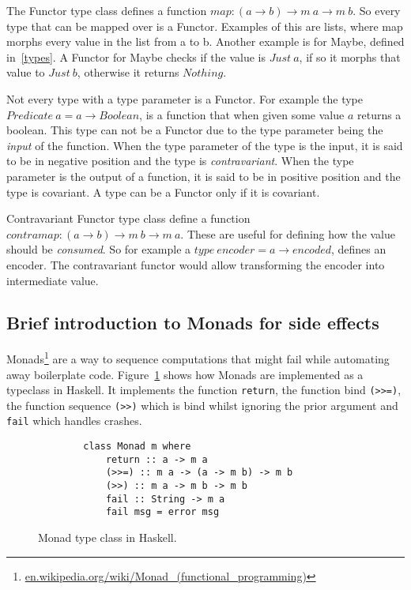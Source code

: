 The Functor type class defines a function $map : (a\rightarrow b) \rightarrow m\
a \rightarrow m\ b$. So every type that can be mapped over is a Functor.
Examples of this are lists, where map morphs every value in the list from a to
b. Another example is for Maybe, defined in~\ref{types}. A Functor for Maybe
checks if the value is $Just\ a$, if so it morphs that value to $Just\ b$,
otherwise it returns $Nothing$. 

Not every type with a type parameter is a Functor. For example the type
$Predicate\ a = a \rightarrow Boolean$, is a function that when given some value
$a$ returns a boolean. This type can not be a Functor due to the type parameter
being the \textit{input} of the function. When the type parameter of the type is
the input, it is said to be in negative position and the type is
\textit{contravariant}.  When the type parameter is the output of a function, it
is said to be in positive position and the type is covariant. A type can be a
Functor only if it is covariant.

Contravariant Functor type class define a function $contramap : (a\rightarrow b)
\rightarrow m\ b \rightarrow m\ a$. These are useful for defining how the value
should be \textit{consumed}. So for example a $type\ encoder = a\rightarrow
encoded$, defines an encoder. The contravariant functor would allow transforming
the encoder into intermediate value.

\subsection{Brief introduction to Monads for side effects}\label{monads}

Monads\footnote{\url{en.wikipedia.org/wiki/Monad_(functional_programming)}} are
a way to sequence computations that might fail while automating away boilerplate
code. Figure~\ref{monadclass} shows how Monads are implemented as a typeclass in
Haskell. It implements the function \texttt{return}, the function bind
\texttt{(>>=)}, the function sequence \texttt{(>>)} which is bind whilst
ignoring the prior argument and \texttt{fail} which handles crashes.

\begin{figure}[H]
    \begin{lstlisting}
        class Monad m where  
            return :: a -> m a  
            (>>=) :: m a -> (a -> m b) -> m b  
            (>>) :: m a -> m b -> m b  
            fail :: String -> m a  
            fail msg = error msg 
    \end{lstlisting}
    \caption{Monad type class in Haskell.}
    \label{monadclass}
\end{figure}

